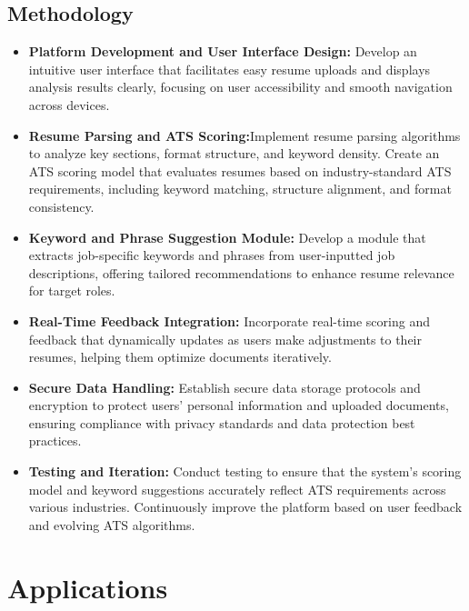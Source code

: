 \documentclass[12pt,a4paper]{report}
\begin{document}
\section{Methodology}
\begin{itemize} \item \textbf{Platform Development and User Interface Design:} Develop an intuitive user interface that facilitates easy resume uploads and displays analysis results clearly, focusing on user accessibility and smooth navigation across devices.


\item \textbf{Resume Parsing and ATS Scoring:}Implement resume parsing algorithms to analyze key sections, format structure, and keyword density. Create an ATS scoring model that evaluates resumes based on industry-standard ATS requirements, including keyword matching, structure alignment, and format consistency.
\item \textbf{Keyword and Phrase Suggestion Module:} Develop a module that extracts job-specific keywords and phrases from user-inputted job descriptions, offering tailored recommendations to enhance resume relevance for target roles.

\item \textbf{Real-Time Feedback Integration:} Incorporate real-time scoring and feedback that dynamically updates as users make adjustments to their resumes, helping them optimize documents iteratively.
\item \textbf{Secure Data Handling:} Establish secure data storage protocols and encryption to protect users' personal information and uploaded documents, ensuring compliance with privacy standards and data protection best practices.

\item \textbf{Testing and Iteration:} Conduct testing to ensure that the system’s scoring model and keyword suggestions accurately reflect ATS requirements across various industries. Continuously improve the platform based on user feedback and evolving ATS algorithms.

\end{itemize}


\chapter{Applications}
\end{document}
